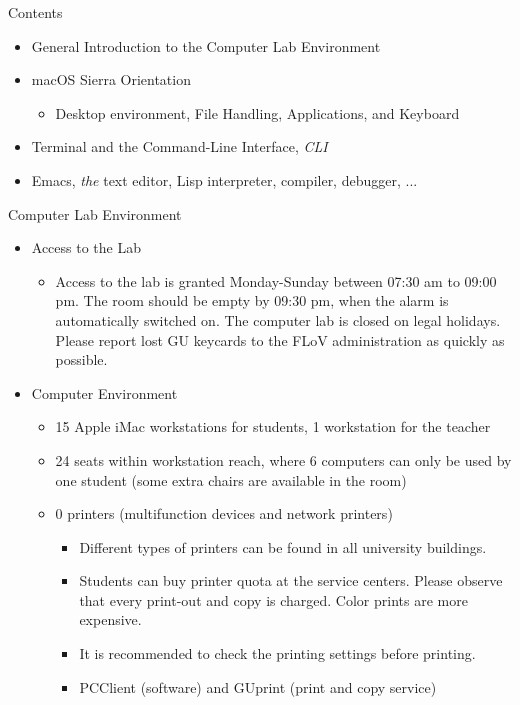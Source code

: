 \documentclass[a4,landscape]{seminar}
\begin{document}
\begin{slide}
  {\Large Contents}
  \begin{itemize}
  \item General Introduction to the Computer Lab Environment
  \item macOS Sierra Orientation
    \begin{itemize}
    \item Desktop environment, File Handling, Applications, and Keyboard
    \end{itemize}
  \item Terminal and the Command-Line Interface, \emph{CLI}
  \item Emacs, \emph{the} text editor, Lisp interpreter, compiler, debugger, ...
  \end{itemize}
\end{slide}
\begin{slide}
  {\Large Computer Lab Environment}
  \begin{itemize}
  \item Access to the Lab
    \begin{itemize}
    \item Access to the lab is granted Monday-Sunday between 07:30 am to
     09:00 pm. The room should be empty by 09:30 pm, when the alarm is
      automatically switched on. The computer lab is closed on legal
      holidays. Please report lost GU keycards to the FLoV
      administration as quickly as possible.
    \end{itemize}
  \item Computer Environment
    \begin{itemize}
    \item 15 Apple iMac workstations for students, 1 workstation for
      the teacher
    \item 24 seats within workstation reach, where 6 computers can only
      be used by one student (some extra chairs are available in the room)
    \item 0 printers (multifunction devices and network printers)
      \begin{itemize}
      \item Different types of printers can be found in all university buildings.
      \item Students can buy printer quota at the service
        centers. Please observe that every print-out and copy is charged. Color
        prints are more expensive.
      \item It is recommended to check the printing settings before printing.
      \item PCClient (software) and GUprint (print and copy service)
      \end{itemize}
    \end{itemize}
  \end{itemize}
\end{slide}
\end{document}
